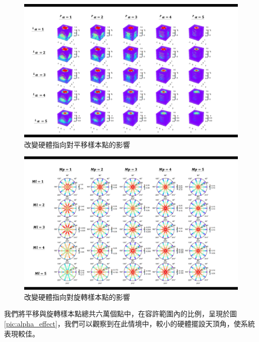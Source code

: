 \begin{figure}[h!]
    \centering
    \includegraphics[width=14cm]{ch4pic/alpha_translate.png}
    \caption{改變硬體指向對平移樣本點的影響}
    \label{pic:alpha_translate}
\end{figure}
\begin{figure}[h!]
    \centering
    \includegraphics[width=14cm]{ch4pic/m_rotate.png}
    \caption{改變硬體指向對旋轉樣本點的影響}
    \label{pic:alpha_rotate}
\end{figure}

我們將平移與旋轉樣本點總共六萬個點中，在容許範圍內的比例，呈現於圖\ref{pic:alpha_effect}，我們可以觀察到在此情境中，較小的硬體擺設天頂角，使系統表現較佳。

